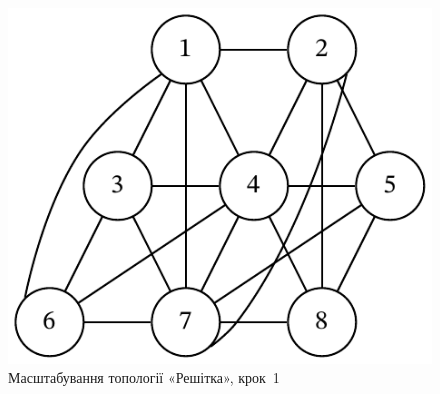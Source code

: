 \documentclass[
	a4paper,
	oneside,
	BCOR = 10mm,
	DIV = 12,
	12pt,
	headings = normal,
]{scrartcl}
\begin{document}
				\begin{figure}[!htbp]
					\centering
					\includegraphics[height=6\baselineskip]{./assets/cluster-08-01-named.pdf}
					\caption{Масштабування топології «Решітка», крок~1}
					\label{fig:cluster-08-05-grid-s01}
				\end{figure}
\end{document}
